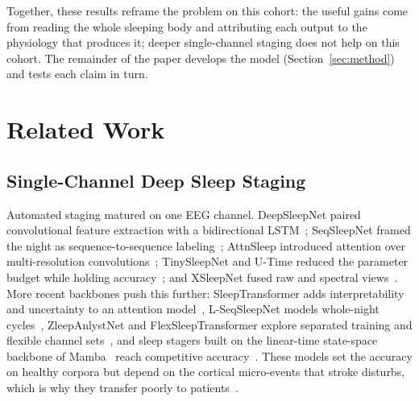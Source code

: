 \documentclass{ieeeaccess}
\begin{document}
Together, these results reframe the problem on this cohort: the useful gains come from reading
the whole sleeping body and attributing each output to the physiology that produces it;
deeper single-channel staging does not help on this cohort. The remainder of the paper develops the model
(Section~\ref{sec:method}) and tests each claim in turn.

\section{Related Work}
\label{sec:related}

\subsection{Single-Channel Deep Sleep Staging}
Automated staging matured on one EEG channel. DeepSleepNet paired convolutional feature
extraction with a bidirectional LSTM~\cite{supratak2017deepsleepnet}; SeqSleepNet framed the
night as sequence-to-sequence labeling~\cite{phan2019seqsleepnet}; AttnSleep introduced
attention over multi-resolution convolutions~\cite{eldele2021attnsleep}; TinySleepNet and
U-Time reduced the parameter budget while holding
accuracy~\cite{supratak2020tinysleepnet,perslev2019utime}; and XSleepNet fused raw and
spectral views~\cite{phan2021xsleepnet}. More recent backbones push this further: SleepTransformer
adds interpretability and uncertainty to an attention model~\cite{sleeptransformer2022}, L-SeqSleepNet
models whole-night cycles~\cite{lseqsleepnet2023}, ZleepAnlystNet and FlexSleepTransformer explore
separated training and flexible channel sets~\cite{jirakittayakorn2024zleep,guo2024flexsleep}, and
sleep stagers built on the linear-time state-space backbone of
Mamba~\cite{gu2023mamba} reach competitive accuracy~\cite{bitmamsleep2024}.
These models set the accuracy on healthy corpora but
depend on the cortical micro-events that stroke disturbs, which is why they transfer poorly to
patients~\cite{bose2026gap}.
\end{document}
